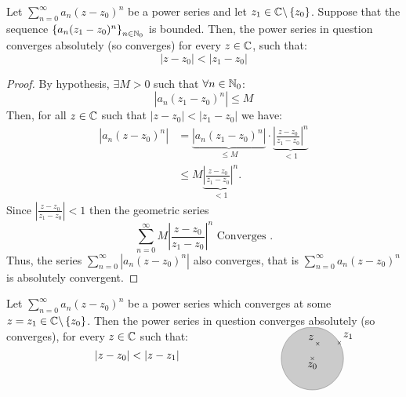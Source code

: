 \begin{proposition}
  Let $\sum_{n=0}^{\infty} a_n (z-z_0) ^n  $ be a power
  series and let $z_1 \in  \mathbb{C} \backslash 
  \left\{ z_0 \right\}$. Suppose that the sequence
  $\left\{ a_{n}(z_1-z_0) ^n  \right\}_{n \in \mathbb{N}_0}$ is 
  bounded. Then, the power series in question converges
  absolutely (so converges) for every $z \in \mathbb{C}$, such that: 
  \[
  \left| z-z_0 \right| <  \left| z_1-z_0 \right|
  \]
\end{proposition}
\begin{proof}
  By hypothesis, $\exists M > 0 $ such that $\forall n \in  \mathbb{N}_0$: 
  \[
  \left| a_n (z_1-z_0) ^n  \right| \leq M
  \]
  Then, for all $z \in \mathbb{C}  $ such that $\left| z-z_0 \right| < \left| z_1-z_0 \right|$ we have:
  \begin{align*}
    \left| a_n (z-z_0) ^n  \right| &= 
    \underbrace{
    \left| a_n (z_1-z_0) ^n  \right|
    }_{ \leq  M} 
    \cdot 
    \underbrace{
    \left| \frac{z - z_0}{z_1-z_0} \right|^n 
    }_{< 1} 
    \\
    & \leq  M 
    \underbrace{
    \left| \frac{z-z_0}{z_1-z_0} \right|^n 
    }_{ < 1}. 
  \end{align*}
  Since $\left| \frac{z-z_0}{z_1-z_0} \right| <  1$ then the geometric series 
  \[
  \sum_{n=0}^{\infty} M \left| \frac{z-z_0}{z_1-z_0} \right|^n  \text{ Converges } .
  \]
  Thus, the series $\sum_{n=0}^{\infty} \left| a_n (z-z_0) ^n  \right| $ also converges,
  that is $\sum_{n=0}^{\infty} a_n (z-z_0) ^n  $ is absolutely convergent.
\end{proof}

\begin{corollary}[]
Let $\sum_{n=0}^{\infty} a_n (z-z_0) ^n  $ be a power series which converges
at some  $z = z_1 \in \mathbb{C}  \backslash \left\{ z_0 \right\} $. Then the power series
in question converges absolutely (so converges), for every $z \in \mathbb{C}  $ such that: 
\[
\left| z-z_0 \right| <  \left| z-z_1 \right| 
\quad  \quad  \quad 
\quad \quad \quad 
\quad \quad \quad 
\quad \quad \quad 
\begin{tikzpicture}[overlay]
  \draw[fill=gray, opacity=0.4] (0, 0) circle (1cm);
  \node[anchor=north] at (0,0) { $z_0 $ };
  \node[] at (0,0) {\tiny $\times   $  };
  \node[anchor=south west] at (30:1) { $z_1 $ };
  \node[anchor=south east ] at (70:0.5) { $z $ };
  \node[] at (70:0.5) {\tiny$\times $  };
  \node[] at (30:1) {\tiny $\times   $ };
\end{tikzpicture}
\]

\begin{center}
\end{center}
\end{corollary}

